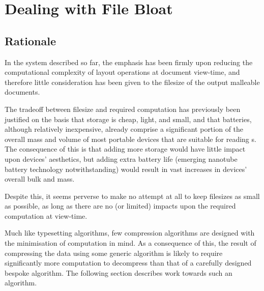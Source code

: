 \chapter{Dealing with File Bloat}\label{ch:bloat}


\section{Rationale}
In the system described so far, the emphasis has been firmly upon reducing the computational complexity of layout operations at document view-time, and therefore little consideration has been given to the filesize of the output malleable documents.


The tradeoff between filesize and required computation has previously been justified on the basis that storage is cheap, light, and small, and that batteries, although relatively inexpensive, already comprise a significant portion of the overall mass and volume of most portable devices that are suitable for reading \ebook{}s. The consequence of this is that adding more storage would have little impact upon devices' aesthetics, but adding extra battery life (emerging nanotube battery technology notwithstanding) would result in vast increases in devices' overall bulk and mass.

Despite this, it seems perverse to make no attempt at all to keep filesizes as small as possible, as long as there are no (or limited) impacts upon the required computation at view-time.

Much like typesetting algorithms, few compression algorithms are designed with the minimisation of computation in mind. As a consequence of this, the result of compressing the data using some generic algorithm is likely to require significantly more computation to decompress than that of a carefully designed bespoke algorithm. The following section describes work towards such an algorithm.

